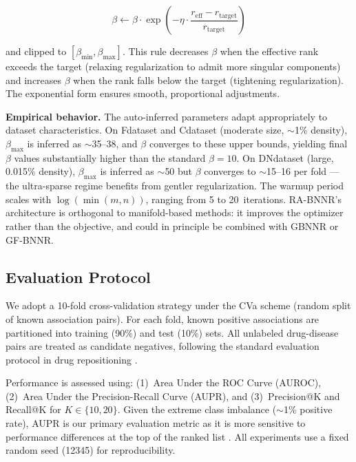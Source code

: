 \documentclass[unnumsec,webpdf,contemporary,large]{oup-authoring-template}
\begin{document}
\begin{equation}
\beta \leftarrow \beta \cdot \exp\left(-\eta \cdot \frac{r_{\text{eff}} - r_{\text{target}}}{r_{\text{target}}}\right)
\label{eq:ra_beta}
\end{equation}

and clipped to $[\beta_{\min}, \beta_{\max}]$. This rule decreases $\beta$ when the effective rank exceeds the target (relaxing regularization to admit more singular components) and increases $\beta$ when the rank falls below the target (tightening regularization). The exponential form ensures smooth, proportional adjustments.

\textbf{Empirical behavior.} The auto-inferred parameters adapt appropriately to dataset characteristics. On Fdataset and Cdataset (moderate size, $\sim$1\% density), $\beta_{\max}$ is inferred as $\sim$35--38, and $\beta$ converges to these upper bounds, yielding final $\beta$ values substantially higher than the standard $\beta = 10$. On DNdataset (large, 0.015\% density), $\beta_{\max}$ is inferred as $\sim$50 but $\beta$ converges to $\sim$15--16 per fold --- the ultra-sparse regime benefits from gentler regularization. The warmup period scales with $\log(\min(m, n))$, ranging from 5 to 20~iterations. RA-BNNR's architecture is orthogonal to manifold-based methods: it improves the optimizer rather than the objective, and could in principle be combined with GBNNR or GF-BNNR.

\subsection{Evaluation Protocol}
\label{sec:evaluation}

We adopt a 10-fold cross-validation strategy under the CVa scheme (random split of known association pairs). For each fold, known positive associations are partitioned into training (90\%) and test (10\%) sets. All unlabeled drug-disease pairs are treated as candidate negatives, following the standard evaluation protocol in drug repositioning \citep{yang2019,gao2023}.

Performance is assessed using: (1)~Area Under the ROC Curve (AUROC), (2)~Area Under the Precision-Recall Curve (AUPR), and (3)~Precision@K and Recall@K for $K \in \{10, 20\}$. Given the extreme class imbalance ($\sim$1\% positive rate), AUPR is our primary evaluation metric as it is more sensitive to performance differences at the top of the ranked list \citep{saito2015}. All experiments use a fixed random seed (12345) for reproducibility.
\end{document}
